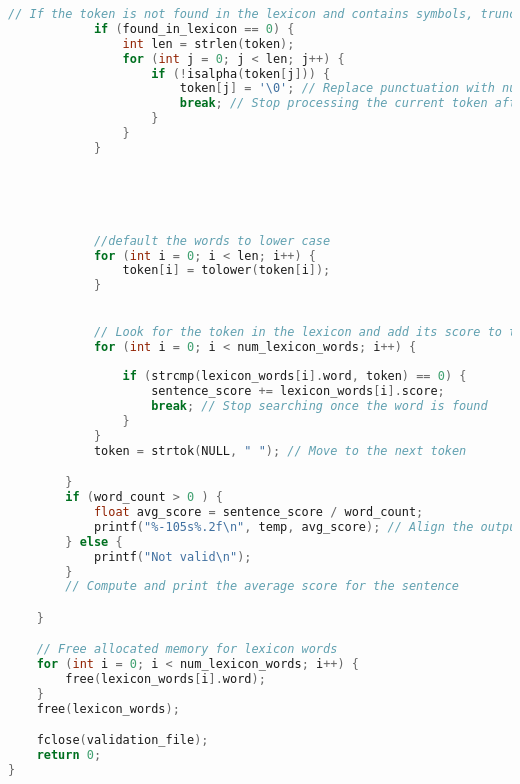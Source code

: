 \documentclass{article}
\begin{document}
\begin{lstlisting}[language=C]
            // If the token is not found in the lexicon and contains symbols, truncate it
            if (found_in_lexicon == 0) {
                int len = strlen(token);
                for (int j = 0; j < len; j++) {
                    if (!isalpha(token[j])) {
                        token[j] = '\0'; // Replace punctuation with null character to truncate the word
                        break; // Stop processing the current token after truncating
                    }
                }
            }
        
            
            


            //default the words to lower case
            for (int i = 0; i < len; i++) {
                token[i] = tolower(token[i]);
            }
            

            // Look for the token in the lexicon and add its score to the sentence score
            for (int i = 0; i < num_lexicon_words; i++) {
                
                if (strcmp(lexicon_words[i].word, token) == 0) {
                    sentence_score += lexicon_words[i].score;
                    break; // Stop searching once the word is found
                }
            }
            token = strtok(NULL, " "); // Move to the next token

        }
        if (word_count > 0 ) {
            float avg_score = sentence_score / word_count;
            printf("%-105s%.2f\n", temp, avg_score); // Align the output using %-100s format specifier
        } else {
            printf("Not valid\n");
        }
        // Compute and print the average score for the sentence

    }

    // Free allocated memory for lexicon words
    for (int i = 0; i < num_lexicon_words; i++) {
        free(lexicon_words[i].word);
    }
    free(lexicon_words);

    fclose(validation_file);
    return 0;
}
\end{lstlisting}
\end{document}
